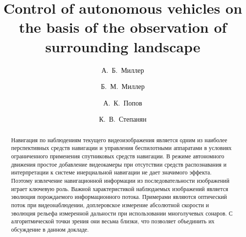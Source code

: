 \fi

\title{Control of autonomous vehicles on the basis of the observation of surrounding landscape}
\author{А.~Б.~Миллер 
  \and  
  Б.~М.~Миллер 
  \and
  А.~К.~Попов 
  \and
  К.~В.~Степанян 
}


\maketitle

\begin{abstract}
Навигация по наблюдениям текущего видеоизображения является одним из наиболее перспективных средств навигации и управления беспилотными аппаратами в условиях ограниченного применения спутниковых средств навигации. В режиме автономного движения простое добавление видеокамеры при отсутствии средств распознавания и интерпретации к системе инерциальной навигации не дает значимого эффекта. Поэтому извлечение навигационной информации из последовательности изображений играет ключевую роль. Важной характеристикой наблюдаемых изображений является эволюция порождаемого информационного потока. Примерами являются оптический поток при видеонаблюдении, доплеровское измерение абсолютной скорости и эволюция рельефа измеренной дальности при использовании многолучевых сонаров. С алгоритмической точки
зрения они весьма близки, что позволяет объединить их обсуждение в данном докладе.

\end{abstract}

